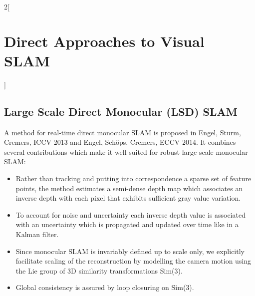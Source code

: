 \documentclass[oneside,fontsize=11pt,paper=a4]{scrartcl}
\begin{document}
\begin{multicols}{2}[\section{Direct Approaches to Visual SLAM}]
\subsection{Large Scale Direct Monocular (LSD) SLAM}
A method for real-time direct monocular SLAM is proposed in Engel, Sturm, Cremers, ICCV 2013 and Engel, Schöps, Cremers, ECCV 2014.
It combines several contributions which make it well-suited for robust large-scale monocular SLAM:
\begin{itemize}
    \item Rather than tracking and putting into correspondence a sparse set of feature points, the method estimates a semi-dense depth map which associates an inverse depth with each pixel that exhibits sufficient gray value variation.
    \item To account for noise and uncertainty each inverse depth value is associated with an uncertainty which is propagated and updated over time like in a Kalman filter.
    \item Since monocular SLAM is invariably defined up to scale only, we explicitly facilitate scaling of the reconstruction by modelling the camera motion using the Lie group of 3D similarity transformations Sim(3).
    \item Global consistency is assured by loop closuring on Sim(3).
\end{itemize}


\end{multicols}
\end{document}
